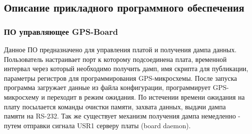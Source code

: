 \subsection{Описание прикладного программного обеспечения}
\subsubsection{ПО управляющее GPS-Board}
\label{sec:board_daemon}
Данное ПО предназначено для управления платой и получения дампа данных. Пользователь настраивает порт к которому подсоединена плата,
временной интервал через который необходимо получить дамп, имя скрипта для публикации, параметры регистров для программирования
GPS-микросхемы. После запуска программа загружает данные из файла конфигурации, программирует GPS-микросхему и переходит в режим
ожидания. По истечении времени ожидания на плату посылается команды очистки памяти, захвата данных, выдачи дампа памяти на RS-232.
Так же существует механизм получения дампа немедленно - путем отправки сигнала USR1 серверу платы (board daemon).

\newpage
